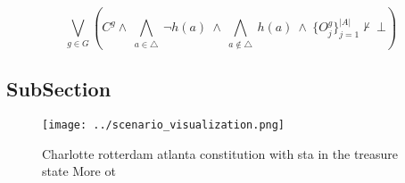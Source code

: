 \documentclass[a4paper]{article}
\begin{document}
\[\bigvee_{g\in G} (C^g \wedge\ \bigwedge_{a\in \triangle}\ \neg h(a)\ \wedge\ \bigwedge_{a\notin \triangle}\ h(a)\ \wedge\ \{O_j^g\}_{j=1}^{|A|} \nvdash\ \bot )\]

\subsection{SubSection}

\begin{figure}
\centering
\texttt{[image: ../scenario\_visualization.png]}
\caption{Charlotte rotterdam atlanta constitution with sta in the treasure state More ot
}
\end{figure}
 
\end{document}
